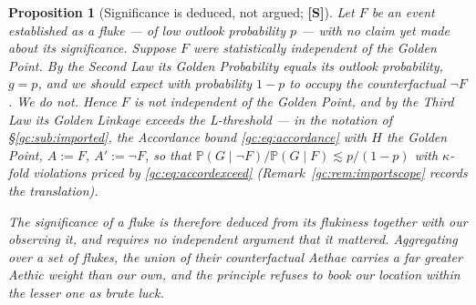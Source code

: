 \documentclass[11pt]{article}
\numberwithin{equation}{section}
\theoremstyle{plain}
\newtheorem{proposition}[theorem]{Proposition}
\theoremstyle{definition}
\theoremstyle{remark}
\newcommand{\PP}{\mathbb{P}}
\begin{document}
\begin{proposition}[Significance is deduced, not argued; \textbf{[S]}]
\label{gc:prop:flukes}
Let $F$ be an event established as a \emph{fluke} --- of low outlook
probability $p$ --- with no claim yet made about its significance.
Suppose $F$ were statistically independent of the Golden Point. By the
Second Law its Golden Probability equals its outlook probability, $g=p$,
and we should expect with probability $1-p$ to occupy the counterfactual
$\neg F$. We do not. Hence $F$ is not independent of the Golden Point,
and by the Third Law its Golden Linkage exceeds the L-threshold
\cite{Nexus, GoldenScience22} --- in the notation of
\S\ref{gc:sub:imported}, the Accordance bound \eqref{gc:eq:accordance}
with $H$ the Golden Point, $A:=F$, $A':=\neg F$, so that
$\PP(G\mid\neg F)/\PP(G\mid F)\lesssim p/(1-p)$ with $\kappa$-fold
violations priced by \eqref{gc:eq:accordexceed}
(Remark~\ref{gc:rem:importscope} records the translation).

The significance of a fluke is therefore \emph{deduced from its
flukiness together with our observing it}, and requires no independent
argument that it mattered. Aggregating over a set of flukes, the union
of their counterfactual Aethae carries a far greater Aethic weight than
our own, and the principle refuses to book our location within the
lesser one as brute luck.
\end{proposition}
\end{document}
